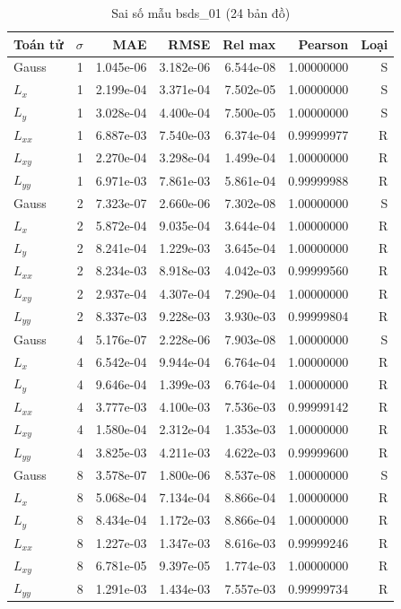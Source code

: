 \begin{table}[p]
\centering
\caption{Sai số mẫu bsds\_01 (24 bản đồ)}
\begin{tabular}{lrrrrrr}
\toprule
Toán tử & $\sigma$ & MAE & RMSE & Rel max & Pearson & Loại\\
\midrule
Gauss & 1 & 1.045e-06 & 3.182e-06 & 6.544e-08 & 1.00000000 & S \\
$L_x$ & 1 & 2.199e-04 & 3.371e-04 & 7.502e-05 & 1.00000000 & S \\
$L_y$ & 1 & 3.028e-04 & 4.400e-04 & 7.500e-05 & 1.00000000 & S \\
$L_{xx}$ & 1 & 6.887e-03 & 7.540e-03 & 6.374e-04 & 0.99999977 & R \\
$L_{xy}$ & 1 & 2.270e-04 & 3.298e-04 & 1.499e-04 & 1.00000000 & R \\
$L_{yy}$ & 1 & 6.971e-03 & 7.861e-03 & 5.861e-04 & 0.99999988 & R \\
Gauss & 2 & 7.323e-07 & 2.660e-06 & 7.302e-08 & 1.00000000 & S \\
$L_x$ & 2 & 5.872e-04 & 9.035e-04 & 3.644e-04 & 1.00000000 & R \\
$L_y$ & 2 & 8.241e-04 & 1.229e-03 & 3.645e-04 & 1.00000000 & R \\
$L_{xx}$ & 2 & 8.234e-03 & 8.918e-03 & 4.042e-03 & 0.99999560 & R \\
$L_{xy}$ & 2 & 2.937e-04 & 4.307e-04 & 7.290e-04 & 1.00000000 & R \\
$L_{yy}$ & 2 & 8.337e-03 & 9.228e-03 & 3.930e-03 & 0.99999804 & R \\
Gauss & 4 & 5.176e-07 & 2.228e-06 & 7.903e-08 & 1.00000000 & S \\
$L_x$ & 4 & 6.542e-04 & 9.944e-04 & 6.764e-04 & 1.00000000 & R \\
$L_y$ & 4 & 9.646e-04 & 1.399e-03 & 6.764e-04 & 1.00000000 & R \\
$L_{xx}$ & 4 & 3.777e-03 & 4.100e-03 & 7.536e-03 & 0.99999142 & R \\
$L_{xy}$ & 4 & 1.580e-04 & 2.312e-04 & 1.353e-03 & 1.00000000 & R \\
$L_{yy}$ & 4 & 3.825e-03 & 4.211e-03 & 4.622e-03 & 0.99999600 & R \\
Gauss & 8 & 3.578e-07 & 1.800e-06 & 8.537e-08 & 1.00000000 & S \\
$L_x$ & 8 & 5.068e-04 & 7.134e-04 & 8.866e-04 & 1.00000000 & R \\
$L_y$ & 8 & 8.434e-04 & 1.172e-03 & 8.866e-04 & 1.00000000 & R \\
$L_{xx}$ & 8 & 1.227e-03 & 1.347e-03 & 8.616e-03 & 0.99999246 & R \\
$L_{xy}$ & 8 & 6.781e-05 & 9.397e-05 & 1.774e-03 & 1.00000000 & R \\
$L_{yy}$ & 8 & 1.291e-03 & 1.434e-03 & 7.557e-03 & 0.99999734 & R \\
\bottomrule
\end{tabular}
\end{table}


